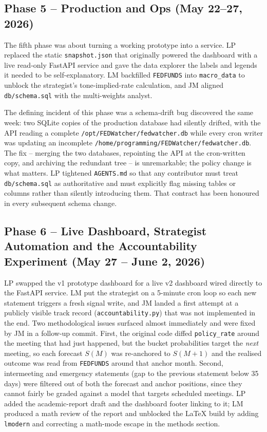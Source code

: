 \subsection{Phase 5 -- Production and Ops (May 22--27, 2026)}
The fifth phase was about turning a working prototype into a service. LP replaced the static \texttt{snapshot.json} that originally powered the dashboard with a live read-only FastAPI service and gave the data explorer the labels and legends it needed to be self-explanatory. LM backfilled \texttt{FEDFUNDS} into \texttt{macro\_data} to unblock the strategist's tone-implied-rate calculation, and JM aligned \texttt{db/schema.sql} with the multi-weights analyst.

The defining incident of this phase was a schema-drift bug discovered the same week: two SQLite copies of the production database had silently drifted, with the API reading a complete \texttt{/opt/FEDWatcher/fedwatcher.db} while every cron writer was updating an incomplete \texttt{/home/programming/FEDWatcher/fedwatcher.db}. The fix -- merging the two databases, repointing the API at the cron-written copy, and archiving the redundant tree -- is unremarkable; the policy change is what matters. LP tightened \texttt{AGENTS.md} so that any contributor must treat \texttt{db/schema.sql} as authoritative and must explicitly flag missing tables or columns rather than silently introducing them. That contract has been honoured in every subsequent schema change.

\subsection{Phase 6 -- Live Dashboard, Strategist Automation and the Accountability Experiment (May 27 -- June 2, 2026)}
LP swapped the v1 prototype dashboard for a live v2 dashboard wired directly to the FastAPI service. LM put the strategist on a 5-minute cron loop so each new statement triggers a fresh signal write, and JM landed a first attempt at a publicly visible track record (\texttt{accountability.py}) that was not implemented in the end. Two methodological issues surfaced almost immediately and were fixed by JM in a follow-up commit. First, the original code diffed \texttt{policy\_rate} around the meeting that had just happened, but the bucket probabilities target the \emph{next} meeting, so each forecast \(S(M)\) was re-anchored to \(S(M{+}1)\) and the realised outcome was read from \texttt{FEDFUNDS} around that anchor month. Second, intermeeting and emergency statements (gap to the previous statement below 35 days) were filtered out of both the forecast and anchor positions, since they cannot fairly be graded against a model that targets scheduled meetings. LP added the academic-report draft and the dashboard footer linking to it; LM produced a math review of the report and unblocked the LaTeX build by adding \texttt{lmodern} and correcting a math-mode escape in the methods section.

